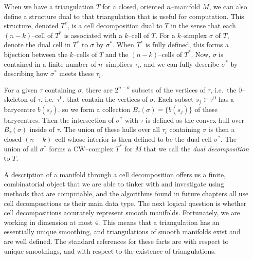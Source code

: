 \begin{defn}
  When we have a triangulation $T$ for a closed, oriented $n$--manifold $M$, we can also define a structure dual to that triangulation that is useful for computation.
  This structure, denoted $T^*$, is a cell decomposition dual to $T$ in the sense that each $(n-k)$--cell of $T^*$ is associated with a $k$--cell of $T$.
  For a $k$--simplex $\sigma$ of $T$, denote the dual cell in $T^*$ to $\sigma$ by $\sigma^*$.
  When $T^*$ is fully defined, this forms a bijection between the $k$--cells of $T$ and the $(n-k)$--cells of $T^*$.
  Now, $\sigma$ is contained in a finite number of $n$--simplices $\tau_i$, and we can fully describe $\sigma^*$ by describing how $\sigma^*$ meets these $\tau_i$.

  For a given $\tau$ containing $\sigma$, there are $2^{n-k}$ subsets of the vertices of $\tau$, i.e.\ the 0--skeleton of $\tau$, i.e.\ $\tau^0$, that contain the vertices of $\sigma$.
  Each subset $s_j\subset\tau^0$ has a barycentre $b(s_j)$, so we form a collection $B_\tau(\sigma)=\{b(s_j)\}$ of these barycentres.
  Then the intersection of $\sigma^*$ with $\tau$ is defined as the convex hull over $B_\tau(\sigma)$ inside of $\tau$.
  The union of these hulls over all $\tau_i$ containing $\sigma$ is then a closed $(n-k)$--cell whose interior is then defined to be the dual cell $\sigma^*$.
  The union of all $\sigma^*$ forms a CW--complex $T^*$ for $M$ that we call the \emph{dual decomposition} to $T$.
\end{defn}

A description of a manifold through a cell decomposition offers us a finite, combinatorial object that we are able to tinker with and investigate using methods that are computable, and the algorithms found in future chapters all use cell decompositions as their main data type.
The next logical question is whether cell decompositions accurately represent smooth manifolds.
Fortunately, we are working in dimension at most 4.
This means that a triangulation has an essentially unique smoothing, and triangulations of smooth manifolds exist and are well defined.
The standard references for these facts are \cite{HirsMazu} with respect to unique smoothings, and \cite{Whit40} with respect to the existence of triangulations.
